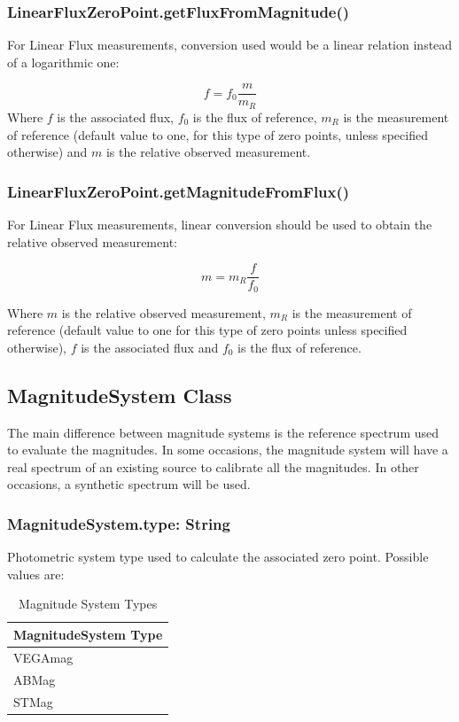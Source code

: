 \documentclass[11pt,a4paper]{ivoa}
\begin{document}
\subsubsection{LinearFluxZeroPoint.getFluxFromMagnitude()}
For Linear Flux measurements, conversion used would be a linear relation instead of a logarithmic one:\par
\[
f = f_0\frac{m}{m_R}
\]
Where $f$ is the associated flux, $f_0$ is the flux of reference, $m_R$ is the measurement of reference (default value to one, for this type of zero points, unless specified otherwise) and $m$ is the relative observed measurement.
\par

\subsubsection{LinearFluxZeroPoint.getMagnitudeFromFlux()}
For Linear Flux measurements, linear conversion should be used to obtain the relative observed measurement:\par
\[
m = m_R \frac{f}{f_0}
\]

Where $m$ is the relative observed measurement, $m_R$ is the measurement of reference (default value to one for this type of zero points unless specified otherwise), $f$ is the associated flux and $f_0$ is the flux of reference.\par

\subsection{MagnitudeSystem Class}
The main difference between magnitude systems is the reference spectrum used to evaluate the magnitudes. In some occasions, the magnitude system will have a real spectrum of an existing source to calibrate all the magnitudes. In other occasions, a synthetic spectrum will be used.
\par

\subsubsection{MagnitudeSystem.type: String}
Photometric system type used to calculate the associated zero point. Possible values are:
\par





\begin{table}[H]
 			\centering
\begin{tabular}{p{2.42in}}
\hline
MagnitudeSystem Type \\
\hline
VEGAmag \\
\hline
ABMag \\
\hline
STMag \\
\hline
\end{tabular}
\caption{Magnitude System Types} 
 \end{table}
\end{document}
